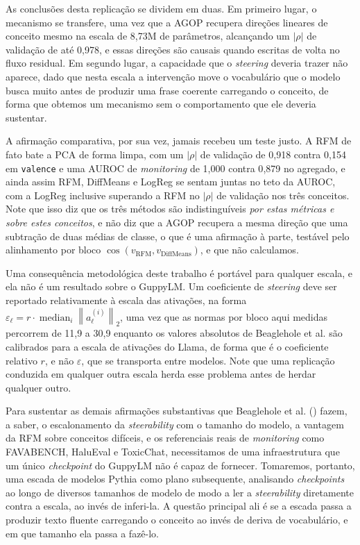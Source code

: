 As conclusões desta replicação se dividem em duas. Em primeiro lugar, o mecanismo se
transfere, uma vez que a AGOP recupera direções lineares de conceito mesmo na escala de
8{,}73M de parâmetros, alcançando um $|\rho|$ de validação de até 0{,}978, e essas direções são
causais quando escritas de volta no fluxo residual. Em segundo lugar, a capacidade que o
\textit{steering} deveria trazer não aparece, dado que nesta escala a intervenção move o
vocabulário que o modelo busca muito antes de produzir uma frase coerente carregando o
conceito, de forma que obtemos um mecanismo sem o comportamento que ele deveria sustentar.

A afirmação comparativa, por sua vez, jamais recebeu um teste justo. A RFM de fato bate a
PCA de forma limpa, com um $|\rho|$ de validação de 0{,}918 contra 0{,}154 em \verb|valence| e
uma AUROC de \textit{monitoring} de 1{,}000 contra 0{,}879 no agregado, e ainda assim RFM, DiffMeans e
LogReg se sentam juntas no teto da AUROC, com a LogReg inclusive superando a RFM no
$|\rho|$ de validação nos três conceitos. Note que
isso diz que os três métodos são indistinguíveis \emph{por estas métricas e sobre estes
conceitos}, e não diz que a AGOP recupera a mesma direção que uma subtração de duas médias
de classe, o que é uma afirmação à parte, testável pelo alinhamento por bloco
$\cos\left(v_{\mathrm{RFM}}, v_{\mathrm{DiffMeans}}\right)$, e que não calculamos.

Uma consequência metodológica deste trabalho é portável para qualquer escala, e ela não é
um resultado sobre o GuppyLM. Um coeficiente de \textit{steering} deve ser reportado
relativamente à escala das ativações, na forma
$\varepsilon_\ell = r \cdot \operatorname*{median}_{i} \left\| a_\ell^{(i)} \right\|_2$,
uma vez que as normas por bloco aqui medidas percorrem de 11{,}9 a 30{,}9 enquanto os valores
absolutos de Beaglehole et al. são calibrados para a escala de ativações do Llama, de forma
que é o coeficiente relativo $r$, e não $\varepsilon$, que se transporta entre modelos.
Note que uma replicação conduzida em qualquer outra escala herda esse problema antes de
herdar qualquer outro.

Para sustentar as demais afirmações substantivas que Beaglehole et al.
(\cite{beaglehole2026toward}) fazem, a saber, o escalonamento da \textit{steerability} com o
tamanho do modelo, a vantagem da RFM sobre conceitos difíceis, e os referenciais reais de
\textit{monitoring} como FAVABENCH, HaluEval e ToxicChat, necessitamos de uma infraestrutura que
um único \textit{checkpoint} do GuppyLM não é capaz de fornecer. Tomaremos, portanto, uma
escada de modelos Pythia como plano subsequente, analisando \textit{checkpoints} ao longo de
diversos tamanhos de modelo de modo a ler a \textit{steerability} diretamente contra a escala,
ao invés de inferi-la. A questão principal ali é se a escada passa a produzir texto fluente
carregando o conceito ao invés de deriva de vocabulário, e em que tamanho ela passa a
fazê-lo.


